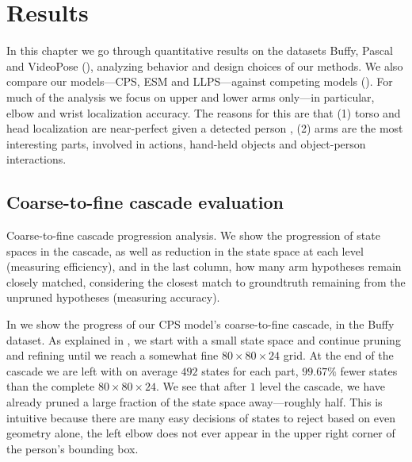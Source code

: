 \chapter{Results}\label{sec:results}

In this chapter we go through quantitative results on the datasets Buffy, 
Pascal and VideoPose (), analyzing behavior and design choices 
of our methods.  We also compare our models---CPS, ESM and LLPS---against 
competing models ().  For much of the analysis we focus on 
upper and lower arms only---in particular, elbow and wrist localization 
accuracy.  The reasons for this are that (1) torso and head localization are 
near-perfect given a detected person \citep{deva2011}, (2) arms are the most 
interesting parts, involved in actions, hand-held objects and object-person 
interactions.


\section{Coarse-to-fine cascade evaluation}
 \begin{table}[tb]
\begin{center}

\caption[Coarse-to-fine cascade progression analysis.]{Coarse-to-fine cascade 
progression analysis. We show the progression of state spaces in the cascade, 
as well as reduction in the state space at each level (measuring efficiency), 
and in the last column, how many arm hypotheses remain closely matched, 
considering the closest match to groundtruth remaining from the unpruned 
hypotheses (measuring accuracy). }
\label{tab:c2f} 
\end{center}
\end{table}

In  we show the progress of our CPS model's coarse-to-fine cascade, 
in the Buffy dataset.
As explained in , we start with a small state space and 
continue pruning and refining until we reach a somewhat fine $80 \times 80 
\times 24$ grid.  At the end of the cascade we are left with on average $492$ 
states for each part, $99.67\%$ fewer states than the complete $80 \times 80 
\times 24$. We see that after $1$ level the cascade, we have already pruned a 
large fraction of the state space away---roughly half.  This is intuitive 
because there are many easy decisions of states to reject based on even 
geometry alone, \eg the left elbow does not ever appear in the upper right 
corner of the person's bounding box.


